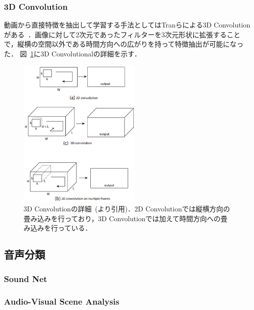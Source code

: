 \subsubsection{3D Convolution}
動画から直接特徴を抽出して学習する手法としてはTranらによる3D Convolution がある~\cite{tran14}．画像に対して2次元であったフィルターを3次元形状に拡張することで，縦横の空間以外である時間方向への広がりを持って特徴抽出が可能になった．
図~\ref{3dconv_image}に3D Convolutionalの詳細を示す．
\begin{figure}[htbp]
 \begin{center}
  \includegraphics[width=6cm]{./Figures/3dconv.eps}
  \caption{3D Convolutionの詳細~(\cite{tran14}より引用)．2D Convolutionでは縦横方向の畳み込みを行っており，3D Convolutionでは加えて時間方向への畳み込みを行っている．}
  \label{3dconv_image}
 \end{center}
\end{figure}

\subsection{音声分類}

\subsubsection{Sound Net}
\subsubsection{Audio-Visual Scene Analysis}
